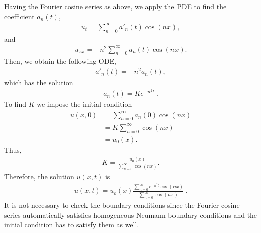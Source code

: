 \begin{questions}


\begin{solution}

Having the Fourier cosine series as above, we apply the PDE to find the coefficient $a_n(t)$, 
\begin{align*}
u_t = \sum_{n=0}^{\infty} a'_n(t)\cos(nx),
\end{align*}
and
\begin{align*}
u_{xx} = -n^2 \sum_{n=0}^{\infty}a_n(t)\cos(nx).
\end{align*}
Then, we obtain the following ODE,
\begin{align*}
a'_n(t) = -n^2a_n(t),
\end{align*}
which has the solution
\begin{align*}
a_n(t) =Ke^{-n^2t}~.
\end{align*}
To find $K$ we impose the initial condition 
\begin{align*}
u(x,0)&=\sum_{n = 0}^{\infty} a_n(0) \cos(n x)\\
&=K\sum_{n = 0}^{\infty} \cos(n x)\\
&=u_0(x).
\end{align*}
Thus,
\begin{align*}
K = \frac{u_0(x)}{\sum_{n=0}^{\infty}\cos(nx)}.
\end{align*}
Therefore, the solution $u(x,t)$ is
\begin{align*}
u(x,t) = u_o(x)\frac{\sum_{n=0}^{\infty}e^{-n^2t}\cos(nx)}{\sum_{n=0}^{\infty}\cos(nx)}~.
\end{align*}
It is not necessary to check the boundary conditions since the Fourier cosine series automatically satisfies homogeneous Neumann boundary conditions and the initial condition has to satisfy them as well.
\end{solution}
\end{questions}
